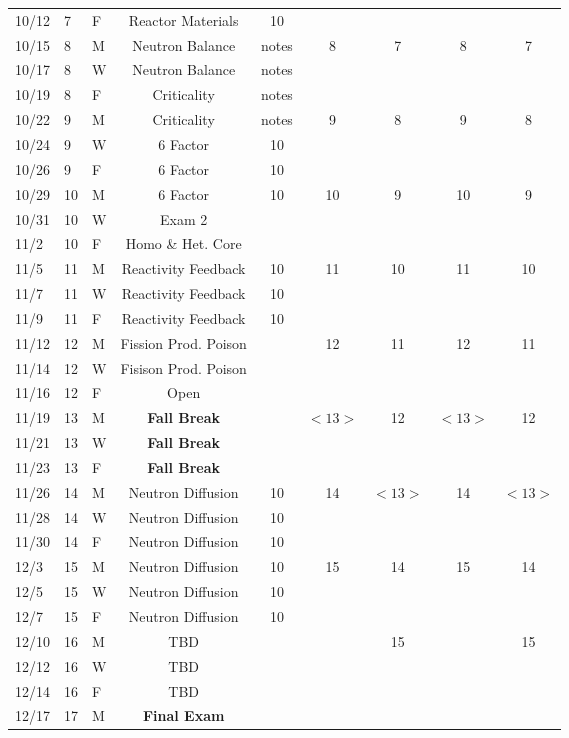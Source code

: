 \documentclass[11pt, a4paper]{article}
\begin{document}
\begin{table}[h]
\begin{center}
\begin{tabular}{lllcccccc}
10/12 & 7 & F & Reactor Materials  & 10 &  &  &  &  \\
10/15 & 8 & M & Neutron Balance  & notes &  8 & 7 & 8 & 7 \\
10/17 & 8 & W & Neutron Balance  & notes &  &  &  &  \\
10/19 & 8 & F & Criticality  & notes &  &  &  &  \\
10/22 & 9 & M & Criticality  & notes & 9 & 8 & 9 & 8 \\
10/24 & 9 & W & 6 Factor  & 10 &  &  &  &  \\
10/26 & 9 & F & 6 Factor  & 10 &  &  &  &  \\
10/29 & 10 & M & 6 Factor  & 10 & 10 & 9 & 10 & 9 \\
10/31 & 10 & W & Exam 2  &  &  &  &  &  \\
11/2 & 10 & F & Homo \& Het. Core   &     &    &    &    &  \\
11/5 & 11 & M & Reactivity Feedback & 10  & 11 & 10 & 11 & 10\\
11/7 & 11 & W & Reactivity Feedback  & 10 &  &  &  &  \\
11/9 & 11 & F & Reactivity Feedback  & 10 &  &  &  &  \\
11/12 & 12 & M & Fission Prod. Poison &  & 12 & 11 & 12 & 11 \\
11/14 & 12 & W & Fisison Prod. Poison  &  &  &  &  &  \\
11/16 & 12 & F & Open &  &  &  &  &  \\
11/19 & 13 & M & \textbf{Fall Break}& & $<13>$ & 12 & $<13>$ & 12 \\
11/21 & 13 & W & \textbf{Fall Break}  &  &  &  &  &  \\
11/23 & 13 & F & \textbf{Fall Break}  &  &  &  &  &  \\
11/26 & 14 & M & Neutron Diffusion& 10&14& $<13>$ & 14 & $<13>$\\
11/28 & 14 & W & Neutron Diffusion  & 10 &  &  &  &  \\
11/30 & 14 & F & Neutron Diffusion  & 10  &  &  &  &  \\
12/3 & 15 & M & Neutron Diffusion & 10 & 15 & 14 & 15 & 14 \\
12/5 & 15 & W & Neutron Diffusion  &  10 &  &  &  &  \\
12/7 & 15 & F & Neutron Diffusion  & 10 &  &  &  &  \\
12/10 & 16 & M &  TBD  &  &  & 15 &  & 15 \\
12/12 & 16 & W & TBD  &  &  &  &  &  \\
12/14 & 16 & F & TBD  &  &  &  &  &  \\
12/17 & 17 & M & \textbf{Final Exam} &   &  &  &  &  \\
\end{tabular}
\end{center}
\end{table}
\FloatBarrier



\end{document}
